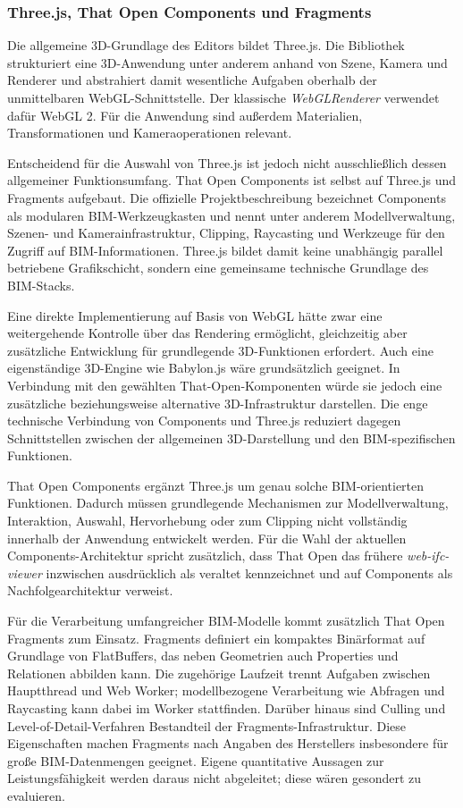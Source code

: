 \subsubsection{Three.js, That Open Components und Fragments}
Die allgemeine 3D-Grundlage des Editors bildet Three.js. Die Bibliothek strukturiert eine
3D-Anwendung unter anderem anhand von Szene, Kamera und Renderer und abstrahiert damit wesentliche
Aufgaben oberhalb der unmittelbaren WebGL-Schnittstelle. Der klassische \textit{WebGLRenderer}
verwendet dafür WebGL 2. Für die Anwendung sind außerdem Materialien, Transformationen und
Kameraoperationen relevant.

Entscheidend für die Auswahl von Three.js ist jedoch nicht ausschließlich dessen allgemeiner
Funktionsumfang. That Open Components ist selbst auf Three.js und Fragments aufgebaut. Die
offizielle Projektbeschreibung bezeichnet Components als modularen BIM-Werkzeugkasten und nennt
unter anderem Modellverwaltung, Szenen- und Kamerainfrastruktur, Clipping, Raycasting und Werkzeuge
für den Zugriff auf BIM-Informationen. Three.js bildet damit keine unabhängig parallel betriebene
Grafikschicht, sondern eine gemeinsame technische Grundlage des BIM-Stacks.

Eine direkte Implementierung auf Basis von WebGL hätte zwar eine weitergehende Kontrolle über das
Rendering ermöglicht, gleichzeitig aber zusätzliche Entwicklung für grundlegende 3D-Funktionen
erfordert. Auch eine eigenständige 3D-Engine wie Babylon.js wäre grundsätzlich geeignet. In
Verbindung mit den gewählten That-Open-Komponenten würde sie jedoch eine zusätzliche beziehungsweise
alternative 3D-Infrastruktur darstellen. Die enge technische Verbindung von Components und Three.js
reduziert dagegen Schnittstellen zwischen der allgemeinen 3D-Darstellung und den BIM-spezifischen
Funktionen.

That Open Components ergänzt Three.js um genau solche BIM-orientierten Funktionen. Dadurch müssen
grundlegende Mechanismen zur Modellverwaltung, Interaktion, Auswahl, Hervorhebung oder zum Clipping
nicht vollständig innerhalb der Anwendung entwickelt werden. Für die Wahl der aktuellen
Components-Architektur spricht zusätzlich, dass That Open das frühere \textit{web-ifc-viewer}
inzwischen ausdrücklich als veraltet kennzeichnet und auf Components als Nachfolgearchitektur
verweist.

Für die Verarbeitung umfangreicher BIM-Modelle kommt zusätzlich That Open Fragments zum Einsatz.
Fragments definiert ein kompaktes Binärformat auf Grundlage von FlatBuffers, das neben Geometrien
auch Properties und Relationen abbilden kann. Die zugehörige Laufzeit trennt Aufgaben zwischen
Hauptthread und Web Worker; modellbezogene Verarbeitung wie Abfragen und Raycasting kann dabei im
Worker stattfinden. Darüber hinaus sind Culling und Level-of-Detail-Verfahren Bestandteil der
Fragments-Infrastruktur. Diese Eigenschaften machen Fragments nach Angaben des Herstellers
insbesondere für große BIM-Datenmengen geeignet. Eigene quantitative Aussagen zur Leistungsfähigkeit
werden daraus nicht abgeleitet; diese wären gesondert zu evaluieren.

